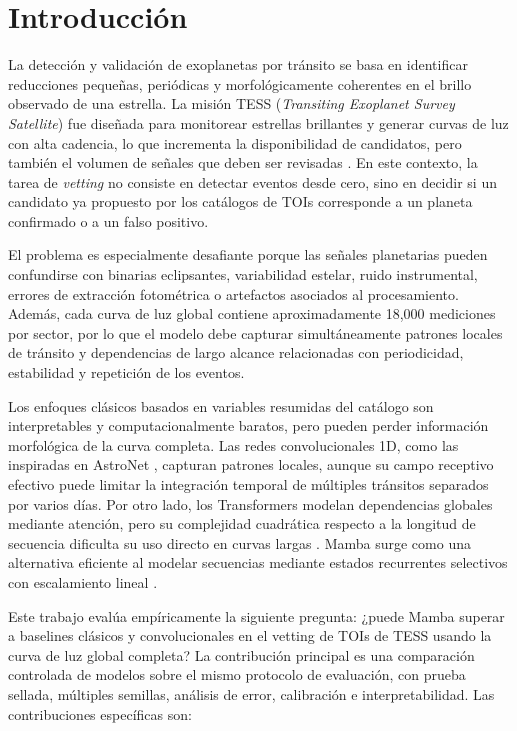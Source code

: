 \documentclass[conference]{IEEEtran}
\begin{document}
\section{Introducción}

La detección y validación de exoplanetas por tránsito se basa en identificar reducciones pequeñas, periódicas y morfológicamente coherentes en el brillo observado de una estrella. La misión TESS (\textit{Transiting Exoplanet Survey Satellite}) fue diseñada para monitorear estrellas brillantes y generar curvas de luz con alta cadencia, lo que incrementa la disponibilidad de candidatos, pero también el volumen de señales que deben ser revisadas \cite{ricker2015tess}. En este contexto, la tarea de \textit{vetting} no consiste en detectar eventos desde cero, sino en decidir si un candidato ya propuesto por los catálogos de TOIs corresponde a un planeta confirmado o a un falso positivo.

El problema es especialmente desafiante porque las señales planetarias pueden confundirse con binarias eclipsantes, variabilidad estelar, ruido instrumental, errores de extracción fotométrica o artefactos asociados al procesamiento. Además, cada curva de luz global contiene aproximadamente 18,000 mediciones por sector, por lo que el modelo debe capturar simultáneamente patrones locales de tránsito y dependencias de largo alcance relacionadas con periodicidad, estabilidad y repetición de los eventos.

Los enfoques clásicos basados en variables resumidas del catálogo son interpretables y computacionalmente baratos, pero pueden perder información morfológica de la curva completa. Las redes convolucionales 1D, como las inspiradas en AstroNet \cite{shallue2018astronet}, capturan patrones locales, aunque su campo receptivo efectivo puede limitar la integración temporal de múltiples tránsitos separados por varios días. Por otro lado, los Transformers modelan dependencias globales mediante atención, pero su complejidad cuadrática respecto a la longitud de secuencia dificulta su uso directo en curvas largas \cite{vaswani2017attention}. Mamba surge como una alternativa eficiente al modelar secuencias mediante estados recurrentes selectivos con escalamiento lineal \cite{gu2023mamba}.

Este trabajo evalúa empíricamente la siguiente pregunta: ¿puede Mamba superar a baselines clásicos y convolucionales en el vetting de TOIs de TESS usando la curva de luz global completa? La contribución principal es una comparación controlada de modelos sobre el mismo protocolo de evaluación, con prueba sellada, múltiples semillas, análisis de error, calibración e interpretabilidad. Las contribuciones específicas son:
\end{document}
